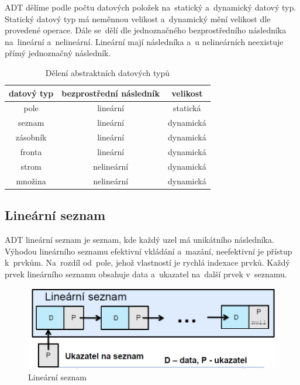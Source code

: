 ADT dělíme podle počtu datových položek na~statický a~dynamický datový typ. Statický datový typ má neměnnou velikost a~dynamický mění velikost dle provedené operace. Dále se~dělí dle jednoznačného bezprostředního následníka na~lineární a~nelineární. Lineární mají následníka a~u nelineárních neexistuje přímý jednoznačný následník.

\begin{table}[ht]
	\centering
	\caption{Dělení abstraktních datových typů}
	\begin{tabular}{|c||c|c|}\hline
		datový typ & bezprostřední následník & velikost  \\\hline\hline
		pole       & lineární                & statická  \\\hline
		seznam     & lineární                & dynamická \\\hline
		zásobník   & lineární                & dynamická \\\hline
		fronta     & lineární                & dynamická \\\hline
		strom      & nelineární              & dynamická \\\hline
		množina    & nelineární              & dynamická \\\hline
	\end{tabular}
\end{table}

\subsection{Lineární seznam}

ADT lineární seznam je seznam, kde každý uzel má unikátního následníka. Výhodou lineárního seznamu efektivní vkládání a~mazání, neefektivní je přístup k~prvkům. Na~rozdíl od~pole, jehož vlastností je rychlá indexace prvků. Každý prvek lineárního seznamu obsahuje data a~ukazatel na~další prvek v~seznamu.

\begin{figure}[ht]
	\centering
	\includegraphics[scale=0.5]{images/linsez.PNG}
	\caption{Lineární seznam}
	\label{linsez}
\end{figure}

